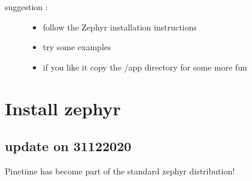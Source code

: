 \documentclass[letterpaper,10pt,english]{sphinxmanual}
\begin{document}
\begin{sphinxVerbatim}[commandchars=\\\{\}]
          
       
        
          


     
           

          
       
\end{sphinxVerbatim}
\begin{description}
\item[{suggestion :}] \leavevmode\begin{itemize}
\item {} 
follow the Zephyr installation instructions

\item {} 
try some examples

\item {} 
if you like it copy the /app directory for some more fun

\end{itemize}

\end{description}

\noindent{}


\chapter{Install zephyr}
\label{\detokenize{installation:install-zephyr}}\label{\detokenize{installation::doc}}

\section{update on 31\sphinxhyphen{}12\sphinxhyphen{}2020}
\label{\detokenize{installation:update-on-31-12-2020}}
Pinetime has become part of the standard zephyr distribution!
\end{document}

